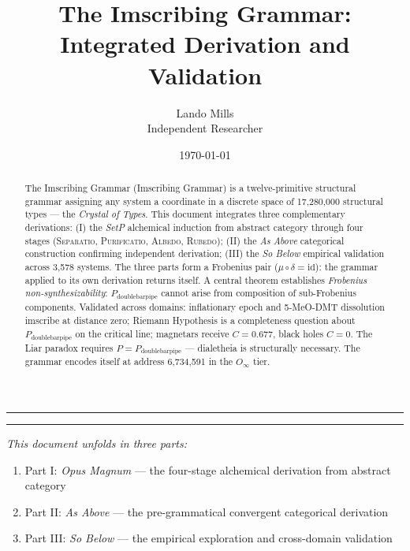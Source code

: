 \documentclass[12pt,a4paper]{article}
\newcommand{\IG}{Imscribing Grammar}
\newcommand{\Separatio}{\textsc{Separatio}}
\newcommand{\Purificatio}{\textsc{Purificatio}}
\newcommand{\Albedo}{\textsc{Albedo}}
\newcommand{\Rubedo}{\textsc{Rubedo}}
\newcommand{\Ppms}{P_{\text{doublebarpipe}}}
\begin{document}
\title{The Imscribing Grammar: Integrated Derivation and Validation}
\author{Lando Mills \\ \normalsize Independent Researcher}
\date{\today}

\maketitle

\vspace{1em}
\begin{center}
\rule{0.5\textwidth}{0.4pt}
\end{center}

\begin{abstract}
The Imscribing Grammar (\IG) is a twelve-primitive structural grammar assigning any system a coordinate in a discrete space of 17,280,000 structural types --- the \emph{Crystal of Types}. This document integrates three complementary derivations: (I) the \textit{SetP} alchemical induction from abstract category through four stages (\Separatio, \Purificatio, \Albedo, \Rubedo); (II) the \textit{As Above} categorical construction confirming independent derivation; (III) the \textit{So Below} empirical validation across 3,578 systems. The three parts form a Frobenius pair ($\mu \circ \delta = \text{id}$): the grammar applied to its own derivation returns itself. A central theorem establishes \emph{Frobenius non-synthesizability}: $\Ppms$ cannot arise from composition of sub-Frobenius components. Validated across domains: inflationary epoch and 5-MeO-DMT dissolution imscribe at distance zero; Riemann Hypothesis is a completeness question about $\Ppms$ on the critical line; magnetars receive $C = 0.677$, black holes $C = 0$. The Liar paradox requires $P = \Ppms$ --- dialetheia is structurally necessary. The grammar encodes itself at address 6,734,591 in the $O_\infty$ tier.
\end{abstract}

\begin{center}
\rule{0.5\textwidth}{0.4pt}
\end{center}

\emph{This document unfolds in three parts:}
\begin{enumerate}
    \item Part I: \textit{Opus Magnum} --- the four-stage alchemical derivation from abstract category
    \item Part II: \textit{As Above} --- the pre-grammatical convergent categorical derivation
    \item Part III: \textit{So Below} --- the empirical exploration and cross-domain validation
\end{enumerate}
\end{document}
